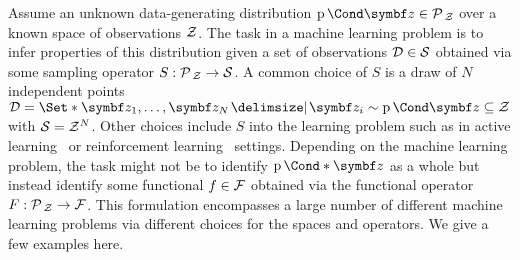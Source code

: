Assume an unknown data-generating distribution $\Prob{\mat{z}} \in \Probs{\Zc}$ over a known space of observations $\mathcal{Z}$.
The task in a machine learning problem is to infer properties of this distribution given a set of observations $\mathcal{D} \in \mathcal{S}$ obtained via some sampling operator $S : \operatorname{\mathcal{P}\mkern2mu}_{\mathcal{Z}} \to \mathcal{S}$.
A common choice of $S$ is a draw of $N$ independent points $\Dc = \Set*{\mat{z}_1, \dots, \mat{z}_N \with \mat{z}_i \sim \Prob{\mat{z}}} \subseteq \Zc$ with $\mathcal{S} = \mathcal{Z}^N$.
Other choices include $S$ into the learning problem such as in active learning~\parencite{murphy_machine_2012} or reinforcement learning~\parencite{sutton_reinforcement_2018} settings.
Depending on the machine learning problem, the task might not be to identify $\Prob*{\mat{z}}$ as a whole but instead identify some functional $f \in \mathcal{F}$ obtained via the functional operator $F : \operatorname{\mathcal{P}\mkern2mu}_{\mathcal{Z}} \to \mathcal{F}$.
This formulation encompasses a large number of different machine learning problems via different choices for the spaces and operators.
We give a few examples here.


